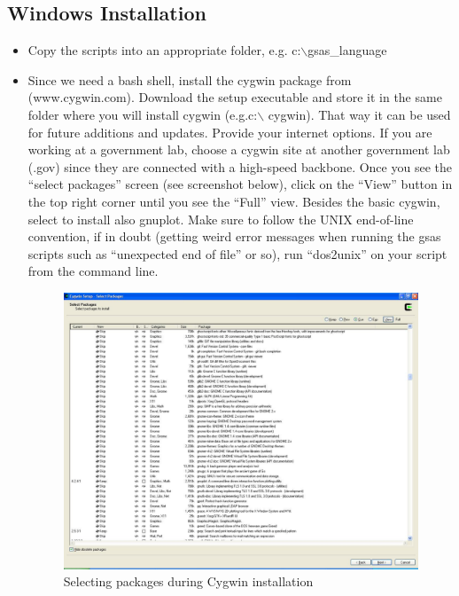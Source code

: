 \documentclass{article}
\begin{document}
\subsection{Windows Installation}

\begin{itemize}
	\item Copy the scripts into an appropriate folder, e.g. c:$\backslash$gsas\_language 
	\item Since we need a bash shell, install the cygwin package from (www.cygwin.com).  Download the setup executable and store it in the same folder where you will install cygwin (e.g.c:$\backslash$ cygwin). That way it can be used for future additions and updates. Provide your internet options. If you are working at a government lab, choose a cygwin site at another government lab (.gov) since they are connected with a high-speed backbone. Once you see the ``select packages'' screen (see screenshot below), click on the ``View'' button in the top right corner until you see the ``Full'' view. Besides the basic cygwin, select to install also gnuplot.  Make sure to follow the UNIX end-of-line convention, if in doubt (getting weird error messages when running the gsas scripts such as ``unexpected end of file'' or so), run ``dos2unix'' on your script from the command line.
\begin{figure}[h]
	\centering
		\includegraphics[width=12cm]{Screenshot1.pdf}
	\caption{Selecting packages during Cygwin installation}
	\label{fig:Screenshot1}
\end{figure}


\end{itemize}
\end{document}
